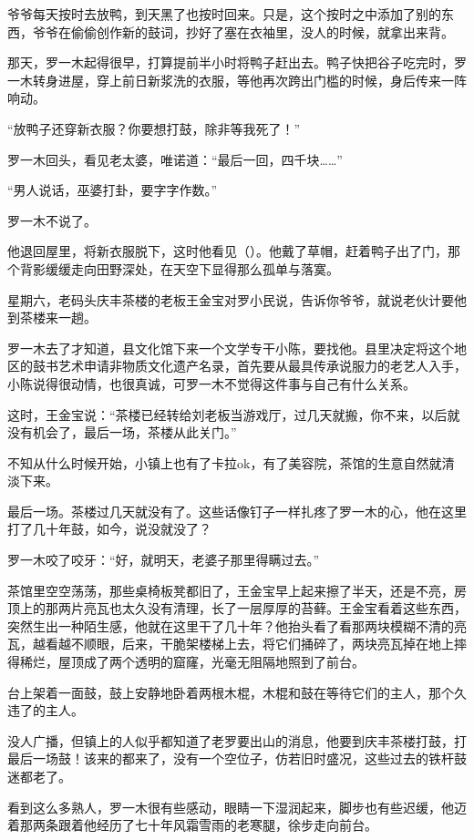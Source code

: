 \documentclass[11pt,a4paper]{ctexart}
\begin{document}
\begin{materialtext}
爷爷每天按时去放鸭，到天黑了也按时回来。只是，这个按时之中添加了别的东西，爷爷在偷偷创作新的鼓词，抄好了塞在衣袖里，没人的时候，就拿出来背。

那天，罗一木起得很早，打算提前半小时将鸭子赶出去。鸭子快把谷子吃完时，罗一木转身进屋，穿上前日新浆洗的衣服，等他再次跨出门槛的时候，身后传来一阵响动。

“放鸭子还穿新衣服？你要想打鼓，除非等我死了！”

罗一木回头，看见老太婆，唯诺道：“最后一回，四千块……”

“男人说话，巫婆打卦，要字字作数。”

罗一木不说了。

他退回屋里，将新衣服脱下，这时他看见（\blank[5em]）。他戴了草帽，赶着鸭子出了门，那个背影缓缓走向田野深处，在天空下显得那么孤单与落寞。

星期六，老码头庆丰茶楼的老板王金宝对罗小民说，告诉你爷爷，就说老伙计要他到茶楼来一趟。

罗一木去了才知道，县文化馆下来一个文学专干小陈，要找他。县里决定将这个地区的鼓书艺术申请非物质文化遗产名录，首先要从最具传承说服力的老艺人入手，小陈说得很动情，也很真诚，可罗一木不觉得这件事与自己有什么关系。

这时，王金宝说：“茶楼已经转给刘老板当游戏厅，过几天就搬，你不来，以后就没有机会了，最后一场，茶楼从此关门。”

不知从什么时候开始，小镇上也有了卡拉ok，有了美容院，茶馆的生意自然就清淡下来。

最后一场。茶楼过几天就没有了。这些话像钉子一样扎疼了罗一木的心，他在这里打了几十年鼓，如今，说没就没了？

罗一木咬了咬牙：“好，就明天，老婆子那里得瞒过去。”

茶馆里空空荡荡，那些桌椅板凳都旧了，王金宝早上起来擦了半天，还是不亮，房顶上的那两片亮瓦也太久没有清理，长了一层厚厚的苔藓。王金宝看着这些东西，突然生出一种陌生感，他就在这里干了几十年？他抬头看了看那两块模糊不清的亮瓦，越看越不顺眼，后来，干脆架楼梯上去，将它们捅碎了，两块亮瓦掉在地上摔得稀烂，屋顶成了两个透明的窟窿，光毫无阻隔地照到了前台。

台上架着一面鼓，鼓上安静地卧着两根木棍，木棍和鼓在等待它们的主人，那个久违了的主人。

没人广播，但镇上的人似乎都知道了老罗要出山的消息，他要到庆丰茶楼打鼓，打最后一场鼓！该来的都来了，没有一个空位子，仿若旧时盛况，这些过去的铁杆鼓迷都老了。

看到这么多熟人，罗一木很有些感动，眼睛一下湿润起来，脚步也有些迟缓，他迈着那两条跟着他经历了七十年风霜雪雨的老寒腿，徐步走向前台。


\end{materialtext}
\end{document}

